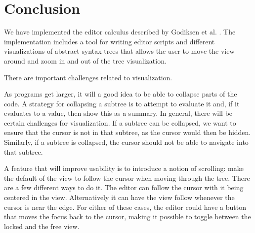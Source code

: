 \section{Conclusion}
\label{conclusion}

We have implemented the editor calculus described by Godiksen et
al. \pepm. The implementation includes a tool for writing editor
scripts and different visualizations of abstract syntax trees that
allows the user to move the view around and zoom in and out of the
tree visualization.

There are important challenges related to visualization.

As programs get larger, it will a good idea to be able to collapse
parts of the code. A strategy for collapsing a subtree is to attempt
to evaluate it and, if it evaluates to a value, then show this as a
summary.  In general, there will be certain challenges for
visualization. If a subtree can be collapsed, we want to ensure that
the cursor is not in that subtree, as the cursor would then be
hidden. Similarly, if a subtree is collapsed, the cursor should not be
able to navigate into that subtree.

A feature that will improve usability is to introduce a notion of
scrolling: make the default of the view to follow the cursor when
moving through the tree. There are a few different ways to do it. The
editor can follow the cursor with it being centered in the
view. Alternatively it can have the view follow whenever the cursor is
near the edge. For either of these cases, the editor could have a
button that moves the focus back to the cursor, making it possible to
toggle between the locked and the free view.

